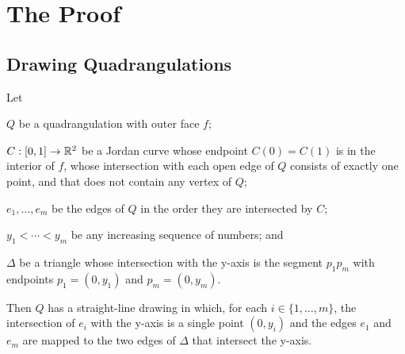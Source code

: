\documentclass{patmorin}
\begin{document}
\section{The Proof}

\subsection{Drawing Quadrangulations}

%



\begin{lem}
    Let
    \begin{compactitem}
    \item $Q$ be a quadrangulation with outer face $f$; 
    \item $C:[0,1]\to\mathbb{R}^2$ be a Jordan curve whose endpoint $C(0)=C(1)$ is
     in the interior of $f$,
     whose intersection with each open edge of $Q$
     consists of exactly one point, and that does not contain
     any vertex of $Q$; 
    \item $e_1,\ldots,e_m$ be the edges of $Q$ in the
    order they are intersected by $C$; 
    \item $y_1<\cdots<y_m$
    be any increasing sequence of numbers; and
    \item $\Delta$ be a triangle whose intersection with the y-axis
     is the segment $p_1p_m$ with endpoints $p_1=(0,y_1)$ and $p_m=(0,y_m)$.
    \end{compactitem}
    Then $Q$ has a straight-line
    drawing in which, for each $i\in\{1,\ldots,m\}$, the intersection
    of $e_i$ with the y-axis is a single point $(0,y_i)$ and the edges
    $e_1$ and $e_m$ are mapped to the two edges of $\Delta$ that
    intersect the y-axis.
\end{lem}
\end{document}
